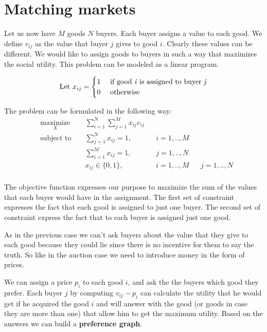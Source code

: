 \section{Matching markets}\label{sec:m-markets}

Let us now have $M$ goods $N$ buyers. Each buyer assigns a value to each good. We define $v_{ij}$ as the value that buyer $j$ gives to good $i$. Clearly these values can be different. We would like to assign goods to buyers in such a way that maximizes the social utility. This problem can be modeled as a linear program.

\begin{equation}
\begin{aligned}
\text{Let } x_{ij}= 
\begin{cases}
	1 \hfill & \text{ if good \textit{i} is assigned to buyer \textit{j}} \\
	0 \hfill &\text{ otherwise}\\
\end{cases}
\end{aligned}
\end{equation}

The problem can be formulated in the following way:
\begin{equation}
\begin{aligned}
& \underset{X}{\textrm{maximize} }
& & \sum_{i=1}^{N}\sum_{j=1}^{M} x_{ij}v_{ij}\\
& \textrm{subject to } 
	&& \sum_{j=1}^N x_{ij}=1, & & i=1,.., M \\
	&&& \sum_{i=1}^M x_{ij}=1, & & j=1,.., N\\	
	&&& x_{ij} \in \{0,1\},  & & i=1,.., M & &  j=1,.., N \\
\end{aligned}
\end{equation}

The objective function expresses our purpose to maximize the sum of the values that each buyer would have in the assignment. The first set of constraint expresses the fact that each good is assigned to just one buyer. The second set of constraint express the fact that to each buyer is assigned just one good.

As in the previous case we can't ask buyers about the value that they give to each good because they could lie since there is no incentive for them to say the truth. So like in the auction case we need to introduce money in the form of prices.

We can assign a price $p_i$ to each good $i$, and ask the the buyers which good they prefer. Each buyer $j$ by computing $v_{ij}-p_i$ can calculate the utility that he would get if he acquired the good $i$ and will answer with the good (or goods in case they are more than one) that allow him to get the maximum utility. Based on the answers we can build a \textbf{preference graph}.

